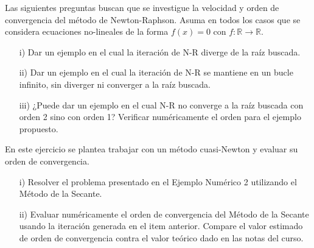 \bigskip
\begin{exercise}

Las siguientes preguntas buscan que se investigue la velocidad y orden de convergencia del método de Newton-Raphson. Asuma en todos los casos que se considera ecuaciones no-lineales de la forma
	$f(x)=0$ con $f:\mathbb{R}\rightarrow \mathbb{R}$.
	\begin{itemize}
		\item[i)] Dar un ejemplo en el cual la iteración de N-R diverge de la raíz buscada.
		
		\item[ii)] Dar un ejemplo en el cual la iteración de N-R se mantiene en un bucle infinito, sin diverger ni converger a la raíz buscada.
		
		\item[iii)] ¿Puede dar un ejemplo en el cual N-R no converge a la raíz buscada con orden 2 sino con orden 1? Verificar numéricamente el orden para el ejemplo propuesto.
	\end{itemize}
	
\end{exercise}


\bigskip
\begin{exercise}
	
	En este ejercicio se plantea trabajar con un método cuasi-Newton y evaluar su orden de convergencia.
	\begin{itemize}
		\item[i)] Resolver el problema presentado en el Ejemplo Numérico 2 utilizando el Método de la Secante.
		
		\item[ii)] Evaluar numéricamente el orden de convergencia del Método de la Secante usando la iteración generada en el item anterior. Compare el valor estimado de orden de convergencia contra el valor teórico dado en las notas del curso.
		
	\end{itemize}
	
\end{exercise}



